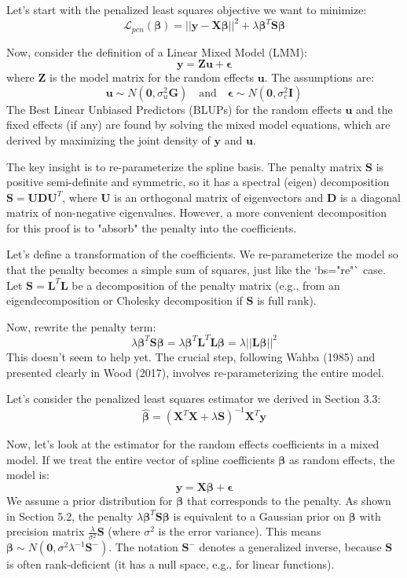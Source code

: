 \documentclass[11pt, a4paper]{article}
\begin{document}
\begin{itemize}
Let's start with the penalized least squares objective we want to minimize:
\[ \mathcal{L}_{pen}(\boldsymbol{\beta}) = ||\mathbf{y} - \mathbf{X}\boldsymbol{\beta}||^2 + \lambda \boldsymbol{\beta}^T \mathbf{S} \boldsymbol{\beta} \]

Now, consider the definition of a Linear Mixed Model (LMM):
\[ \mathbf{y} = \mathbf{Z}\mathbf{u} + \boldsymbol{\epsilon} \]
where $\mathbf{Z}$ is the model matrix for the random effects $\mathbf{u}$. The assumptions are:
\[ \mathbf{u} \sim N(\mathbf{0}, \sigma_u^2 \mathbf{G}) \quad \text{and} \quad \boldsymbol{\epsilon} \sim N(\mathbf{0}, \sigma_e^2 \mathbf{I}) \]
The Best Linear Unbiased Predictors (BLUPs) for the random effects $\mathbf{u}$ and the fixed effects (if any) are found by solving the mixed model equations, which are derived by maximizing the joint density of $\mathbf{y}$ and $\mathbf{u}$.

The key insight is to re-parameterize the spline basis. The penalty matrix $\mathbf{S}$ is positive semi-definite and symmetric, so it has a spectral (eigen) decomposition $\mathbf{S} = \mathbf{U}\mathbf{D}\mathbf{U}^T$, where $\mathbf{U}$ is an orthogonal matrix of eigenvectors and $\mathbf{D}$ is a diagonal matrix of non-negative eigenvalues. However, a more convenient decomposition for this proof is to "absorb" the penalty into the coefficients.

Let's define a transformation of the coefficients. We re-parameterize the model so that the penalty becomes a simple sum of squares, just like the `bs="re"` case. Let $\mathbf{S} = \mathbf{L}^T\mathbf{L}$ be a decomposition of the penalty matrix (e.g., from an eigendecomposition or Cholesky decomposition if $\mathbf{S}$ is full rank).

Now, rewrite the penalty term:
\[ \lambda \boldsymbol{\beta}^T \mathbf{S} \boldsymbol{\beta} = \lambda \boldsymbol{\beta}^T \mathbf{L}^T\mathbf{L} \boldsymbol{\beta} = \lambda ||\mathbf{L}\boldsymbol{\beta}||^2 \]
This doesn't seem to help yet. The crucial step, following Wahba (1985) and presented clearly in Wood (2017), involves re-parameterizing the entire model.

Let's consider the penalized least squares estimator we derived in Section 3.3:
\[ \hat{\boldsymbol{\beta}} = (\mathbf{X}^T\mathbf{X} + \lambda\mathbf{S})^{-1}\mathbf{X}^T\mathbf{y} \]

Now, let's look at the estimator for the random effects coefficients in a mixed model. If we treat the entire vector of spline coefficients $\boldsymbol{\beta}$ as random effects, the model is:
\[ \mathbf{y} = \mathbf{X}\boldsymbol{\beta} + \boldsymbol{\epsilon} \]
We assume a prior distribution for $\boldsymbol{\beta}$ that corresponds to the penalty. As shown in Section 5.2, the penalty $\lambda \boldsymbol{\beta}^T \mathbf{S} \boldsymbol{\beta}$ is equivalent to a Gaussian prior on $\boldsymbol{\beta}$ with precision matrix $\frac{\lambda}{\sigma^2}\mathbf{S}$ (where $\sigma^2$ is the error variance). This means $\boldsymbol{\beta} \sim N(\mathbf{0}, \sigma^2 \lambda^{-1} \mathbf{S}^{-})$. The notation $\mathbf{S}^{-}$ denotes a generalized inverse, because $\mathbf{S}$ is often rank-deficient (it has a null space, e.g., for linear functions).


\end{itemize}
\end{document}
